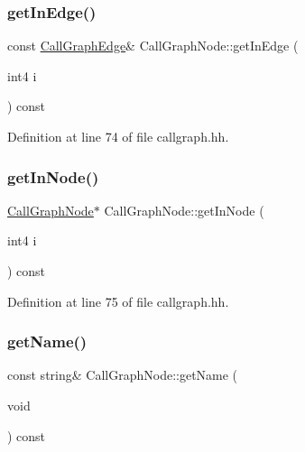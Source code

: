 \subsubsection{\texorpdfstring{getInEdge()}{getInEdge()}}
{\footnotesize\ttfamily const \mbox{\hyperlink{class_call_graph_edge}{Call\+Graph\+Edge}}\& Call\+Graph\+Node\+::get\+In\+Edge (\begin{DoxyParamCaption}\item[{int4}]{i }\end{DoxyParamCaption}) const\hspace{0.3cm}{\ttfamily [inline]}}



Definition at line 74 of file callgraph.\+hh.

\mbox{\label{class_call_graph_node_ab795928265254bfa049b445baf7eabcc}} 
\subsubsection{\texorpdfstring{getInNode()}{getInNode()}}
{\footnotesize\ttfamily \mbox{\hyperlink{class_call_graph_node}{Call\+Graph\+Node}}$\ast$ Call\+Graph\+Node\+::get\+In\+Node (\begin{DoxyParamCaption}\item[{int4}]{i }\end{DoxyParamCaption}) const\hspace{0.3cm}{\ttfamily [inline]}}



Definition at line 75 of file callgraph.\+hh.

\mbox{\label{class_call_graph_node_a2277f2f032877d1f0251e5bdb6c4b32a}} 
\subsubsection{\texorpdfstring{getName()}{getName()}}
{\footnotesize\ttfamily const string\& Call\+Graph\+Node\+::get\+Name (\begin{DoxyParamCaption}\item[{void}]{ }\end{DoxyParamCaption}) const\hspace{0.3cm}{\ttfamily [inline]}}



